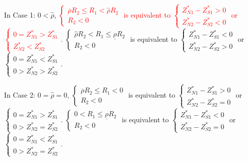 \documentclass[10pt]{article}
\newcommand{\hhred}{\textcolor{red}}
\begin{document}
In Case 1: $ 0 < {\hat \rho} $, \hhred{$ \left\{ \begin{matrix} \overline{\rho} R_2 \leqslant R_1 < {\hat \rho} R_2 \\ R_2 < 0 \end{matrix} \right. $ is equivalent to $ \left\{ \begin{matrix} Z_{N 1}^* - Z_{S 1}^* > 0 \\ Z_{N 2}^* - Z_{S 2}^* < 0 \end{matrix} \right. $ or $ \left\{ \begin{matrix} 0 = Z_{N 1}^* > Z_{S 1}^* \\ Z_{N 2}^* < Z_{S 2}^* \end{matrix} \right. $.} $ \left\{ \begin{matrix} {\hat \rho} R_2 < R_1 \leqslant \underline{\rho} R_2 \\ R_2 < 0 \end{matrix} \right. $ is equivalent to $ \left\{ \begin{matrix} Z_{N 1}^* - Z_{S 1}^* < 0 \\ Z_{N 2}^* - Z_{S 2}^* > 0 \end{matrix} \right. $ or $ \left\{ \begin{matrix} 0 = Z_{N 1}^* < Z_{S 1}^* \\ 0 > Z_{N 2}^* > Z_{S 2}^* \end{matrix} \right. $.

In Case 2: $ 0 = {\hat \rho} = 0 $, $ \left\{ \begin{matrix} \overline{\rho} R_2 \leqslant R_1 < 0 \\ R_2 < 0 \end{matrix} \right. $ is equivalent to $ \left\{ \begin{matrix} Z_{N 1}^* - Z_{S 1}^* > 0 \\ Z_{N 2}^* - Z_{S 2}^* = 0 \end{matrix} \right. $ or $ \left\{ \begin{matrix} 0 = Z_{N 1}^* > Z_{S 1}^* \\ 0 > Z_{N 2}^* = Z_{S 2}^* \end{matrix} \right. $. $ \left\{ \begin{matrix} 0 < R_1 \leqslant \underline{\rho} R_2 \\ R_2 < 0 \end{matrix} \right. $ is equivalent to $ \left\{ \begin{matrix} Z_{N 1}^* - Z_{S 1}^* < 0 \\ Z_{N 2}^* - Z_{S 2}^* = 0 \end{matrix} \right. $ or $ \left\{ \begin{matrix} 0 = Z_{N 1}^* < Z_{S 1}^* \\ 0 > Z_{N 2}^* = Z_{S 2}^* \end{matrix} \right. $.
\end{document}
